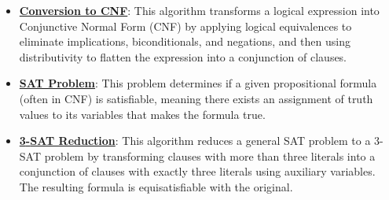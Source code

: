 \documentclass{article}%
\begin{document}
\begin{itemize}[leftmargin=*]%
\item \href{https://purdue.brightspace.com/d2l/common/assets/pdfjs-d2l-dist/1.0.14-legacy/web/viewer.html?file=\%2Fcontent\%2Fenforced\%2F1095467-wl.202510.CS.24300.001\%2F13L1-Logic.pdf\%3Fou\%3D1095467\&lang=en-us\&container=d2l-fileviewer-rendered-pdf\&fullscreen=d2l-fileviewer-rendered-pdf-dialog\&height=667#page=17}{\textbf{Conversion to CNF}}: This algorithm transforms a logical expression into Conjunctive Normal Form (CNF) by applying logical equivalences to eliminate implications, biconditionals, and negations, and then using distributivity to flatten the expression into a conjunction of clauses.%
\item \href{https://purdue.brightspace.com/d2l/common/assets/pdfjs-d2l-dist/1.0.14-legacy/web/viewer.html?file=\%2Fcontent\%2Fenforced\%2F1095467-wl.202510.CS.24300.001\%2F13L1-Logic.pdf\%3Fou\%3D1095467\&lang=en-us\&container=d2l-fileviewer-rendered-pdf\&fullscreen=d2l-fileviewer-rendered-pdf-dialog\&height=667#page=15}{\textbf{SAT Problem}}: This problem determines if a given propositional formula (often in CNF) is satisfiable, meaning there exists an assignment of truth values to its variables that makes the formula true.%
\item \href{https://purdue.brightspace.com/d2l/common/assets/pdfjs-d2l-dist/1.0.14-legacy/web/viewer.html?file=\%2Fcontent\%2Fenforced\%2F1095467-wl.202510.CS.24300.001\%2F13L1-Logic.pdf\%3Fou\%3D1095467\&lang=en-us\&container=d2l-fileviewer-rendered-pdf\&fullscreen=d2l-fileviewer-rendered-pdf-dialog\&height=667#page=24}{\textbf{3{-}SAT Reduction}}: This algorithm reduces a general SAT problem to a 3-SAT problem by transforming clauses with more than three literals into a conjunction of clauses with exactly three literals using auxiliary variables. The resulting formula is equisatisfiable with the original.%
\end{itemize}%
\end{document}
